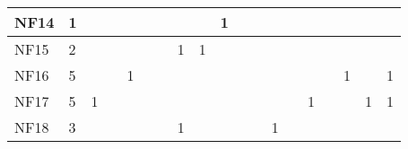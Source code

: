 \begin{table}[]
{\begin{tabular}{|l|l|l|l|l|l|l|l|l|l|l|l|l|l|l|l|l|l|l|}
NF14 & 1                                                     &                                                  &    &    &    &    &                                                  &    & 1  &    &    &                                                   &    &                                                   &    &                                                             &                                                             &                                                             \\ \hline
NF15 & 2                                                     &                                                  &    &    &    &    & 1                                                & 1  &    &    &    &                                                   &    &                                                   &    &                                                             &                                                             &                                                             \\ \hline
NF16 & 5                                                     &                                                  &    & 1  &    &    &                                                  &    &    &    &    &                                                   &    &                                                   &    & 1                                                           &                                                             & 1                                                           \\ \hline
NF17 & 5                                                     & 1                                                &    &    &    &    &                                                  &    &    &    &    &                                                   &    & 1                                                 &    &                                                             & 1                                                           & 1                                                           \\ \hline
NF18 & 3                                                     &                                                  &    &    &    &    & 1                                                &    &    &    &    & 1                                                 &    &                                                   &    &                                                             &                                                             &                                                             \\ \hline

\end{tabular}}
\end{table}
